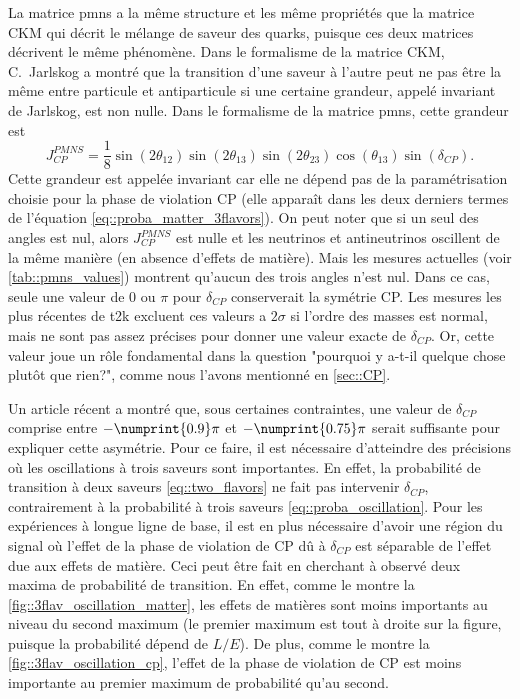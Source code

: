         La matrice \gls{pmns} a la même structure et les même propriétés que la matrice CKM qui décrit le mélange de saveur des quarks, puisque ces deux matrices décrivent le même phénomène. Dans le formalisme de la matrice CKM, C.~Jarlskog a montré que la transition d'une saveur à l'autre peut ne pas être la même entre particule et antiparticule si une certaine grandeur, appelé invariant de Jarlskog, est non nulle\cite{Jarlskog1985}. Dans le formalisme de la matrice \gls{pmns}, cette grandeur est
        \begin{equation}
          J_{CP}^{PMNS}=\frac{1}{8}\sin(2\theta_{12})\sin(2\theta_{13})\sin(2\theta_{23})\cos(\theta_{13})\sin(\delta_{CP}).
        \end{equation}
        Cette grandeur est appelée invariant car elle ne dépend pas de la paramétrisation choisie pour la phase de violation CP (elle apparaît dans les deux derniers termes de l'équation \eqref{eq::proba_matter_3flavors}). On peut noter que si un seul des angles est nul, alors $J_{CP}^{PMNS}$ est nulle et les neutrinos et antineutrinos oscillent de la même manière (en absence d'effets de matière). Mais les mesures actuelles (voir \autoref{tab::pmns_values}) montrent qu'aucun des trois angles n'est nul. Dans ce cas, seule une valeur de $0$ ou $\pi$ pour $\delta_{CP}$ conserverait la symétrie CP. Les mesures les plus récentes de \gls{t2k} excluent ces valeurs a $2\sigma$\cite{Abe2018} si l'ordre des masses est normal, mais ne sont pas assez précises pour donner une valeur exacte de $\delta_{CP}$. Or, cette valeur joue un rôle fondamental dans la question "pourquoi y a-t-il quelque chose plutôt que rien?", comme nous l'avons mentionné en \autoref{sec::CP}.
        
        Un article récent\cite{Buccella2018}  a montré que, sous certaines contraintes, une valeur de $\delta_{CP}$ comprise entre $-\numprint{0.9}\pi$ et $-\numprint{0.75}\pi$ serait suffisante pour expliquer cette asymétrie. Pour ce faire, il est nécessaire d'atteindre des précisions où les oscillations à trois saveurs sont importantes. En effet, la probabilité de transition à deux saveurs \eqref{eq::two_flavors} ne fait pas intervenir $\delta_{CP}$, contrairement à la probabilité à trois saveurs \eqref{eq::proba_oscillation}. Pour les expériences à longue ligne de base, il est en plus nécessaire d'avoir une région du signal où l'effet de la phase de violation de CP dû à $\delta_{CP}$ est séparable de l'effet due aux effets de matière. Ceci peut être fait en cherchant à observé deux maxima de probabilité de transition. En effet,  comme le montre la \autoref{fig::3flav_oscillation_matter}, les effets de matières sont moins importants au niveau du second maximum (le premier maximum est tout à droite sur la figure, puisque la probabilité dépend de $L/E$). De plus, comme le montre la \autoref{fig::3flav_oscillation_cp}, l'effet de la phase de violation de CP est moins importante au premier maximum de probabilité qu'au second.

